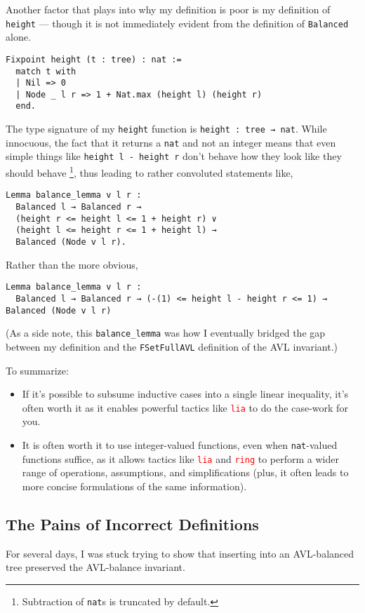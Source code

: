\documentclass[acmsmall, authorversion, nonacm, overload]{acmart}
\begin{document}
\vspace{1em}
\noindent Another factor that plays into why my definition is poor is
my definition of \verb|height| --- though it is not immediately evident from the definition of \verb|Balanced|
alone.
\begin{verbatim}
Fixpoint height (t : tree) : nat :=
  match t with
  | Nil => 0
  | Node _ l r => 1 + Nat.max (height l) (height r)
  end.
\end{verbatim}
The type signature of my \verb|height| function is \verb|height : tree → nat|.
While innocuous, the fact that it returns a \verb|nat| and not an integer
means that even simple things like \verb|height l - height r|
don't behave how they look like they should behave
\footnote{Subtraction of \texttt{nat}s is truncated by default.},
thus leading to rather convoluted statements like,
\begin{verbatim}
Lemma balance_lemma v l r :
  Balanced l → Balanced r →
  (height r <= height l <= 1 + height r) ∨
  (height l <= height r <= 1 + height l) →
  Balanced (Node v l r).
\end{verbatim}
Rather than the more obvious,
\begin{verbatim}
Lemma balance_lemma v l r :
  Balanced l → Balanced r → (-(1) <= height l - height r <= 1) → Balanced (Node v l r)
\end{verbatim}
(As a side note, this \verb|balance_lemma| was how I eventually bridged the gap between
my definition and the \verb|FSetFullAVL| definition of the AVL invariant.)

\vspace{1em}
\noindent To summarize:
\begin{itemize}
\item If it's possible to subsume inductive cases into a single linear inequality,
  it's often worth it as it enables powerful tactics like \texttt{\textcolor{red}{lia}}
  to do the case-work for you.
\item It is often worth it to use integer-valued functions, even when \verb|nat|-valued functions suffice,
  as it allows tactics like \texttt{\textcolor{red}{lia}} and \texttt{\textcolor{red}{ring}}
  to perform a wider range of operations, assumptions, and simplifications
  (plus, it often leads to more concise formulations of the same information).
\end{itemize}

\subsection{The Pains of Incorrect Definitions}
For several days, I was stuck trying to show that
inserting into an AVL-balanced tree preserved
the AVL-balance invariant.
\end{document}
